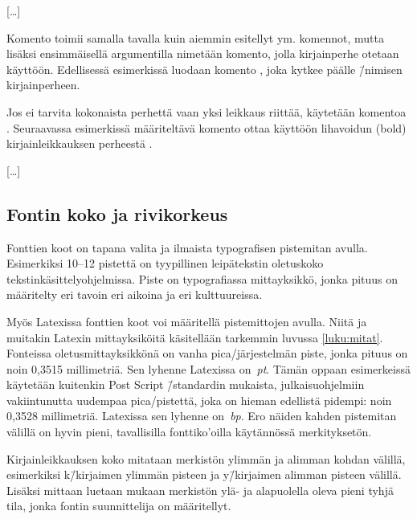 \begin{koodilohkosis}
  […]
\end{koodilohkosis}

Komento  toimii samalla tavalla kuin aiemmin
esitellyt  ym. komennot, mutta lisäksi
ensimmäisellä argumentilla nimetään komento, jolla kirjainperhe otetaan
käyttöön. Edellisessä esimerkissä luodaan komento
, joka kytkee päälle 
\=/nimisen kirjainperheen.

Jos ei tarvita kokonaista perhettä vaan yksi leikkaus riittää, käytetään
komentoa . Seuraavassa esimerkissä määriteltävä
komento  ottaa käyttöön lihavoidun (bold)
kirjainleikkauksen perheestä .

\begin{koodilohkosis}
  […]
\end{koodilohkosis}

\subsection{Fontin koko ja rivikorkeus}

Fonttien koot on tapana valita ja ilmaista typografisen pistemitan
avulla. Esimerkiksi 10--12 pistettä on tyypillinen leipätekstin
oletuskoko tekstinkäsittelyohjelmissa. Piste on typografiassa
mittayksikkö, jonka pituus on määritelty eri tavoin eri aikoina ja eri
kulttuureissa.

Myös Latexissa fonttien koot voi määritellä pistemittojen avulla. Niitä
ja muitakin Latexin mittayksiköitä käsitellään tarkemmin luvussa
\ref{luku:mitat}. Fonteissa oletusmittayksikkönä on vanha
pica\-/järjestelmän piste, jonka pituus on noin 0,3515 millimetriä. Sen
lyhenne Latexissa on~\emph{pt}. Tämän oppaan esimerkeissä käytetään
kuitenkin Post Script \=/standardin mukaista, julkaisuohjelmiin
vakiintunutta uudempaa pica\-/pistettä, joka on hieman edellistä
pidempi: noin 0,3528 millimetriä. Latexissa sen lyhenne on~\emph{bp}.
Ero näiden kahden pistemitan välillä on hyvin pieni, tavallisilla
fonttiko'oilla käytännössä merkityksetön.

Kirjainleikkauksen koko mitataan merkistön ylimmän ja alimman kohdan
välillä, esimerkiksi k\=/kirjaimen ylimmän pisteen ja y\=/kirjaimen
alimman pisteen välillä. Lisäksi mittaan luetaan mukaan merkistön ylä-
ja alapuolella oleva pieni tyhjä tila, jonka fontin suunnittelija on
määritellyt.

